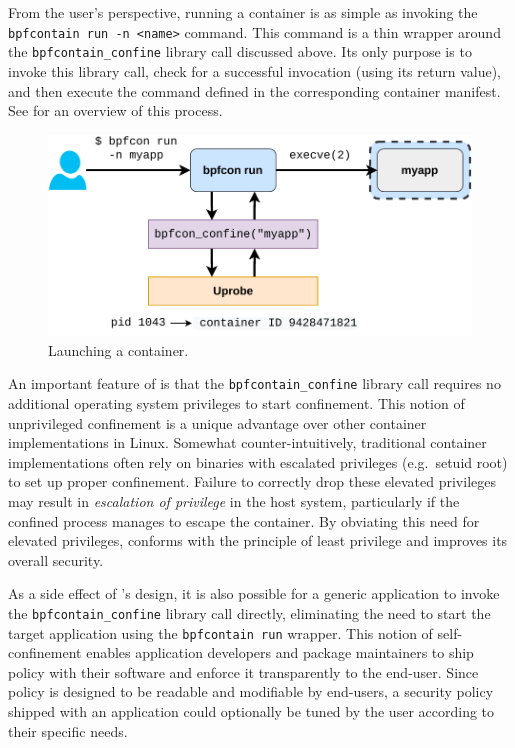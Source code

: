 From the user's perspective, running a \bpfcontain{} container is as simple as invoking the \texttt{bpfcontain run -n <name>} command. This command is a thin wrapper around the \texttt{bpfcontain\_confine} library call discussed above. Its only purpose is to invoke this library call, check for a successful invocation (using its return value), and then execute the command defined in the corresponding container manifest. See  for an overview of this process.

\begin{figure}[htb]
  \centering
  \includegraphics[width=0.6\linewidth]{figs/launch.pdf}
  \caption{Launching a \bpfcontain{} container.}%
  \label{fig:launch}
\end{figure}

An important feature of \bpfcontain{} is that the \lstinline[language=c]|bpfcontain_confine| library call requires no additional operating system privileges to start confinement.  This notion of unprivileged confinement is a unique advantage over other container implementations in Linux.  Somewhat counter-intuitively, traditional container implementations often rely on binaries with escalated privileges (e.g.~setuid root) to set up proper confinement.  Failure to correctly drop these elevated privileges may result in \textit{escalation of privilege} in the host system, particularly if the confined process manages to escape the container.  By obviating this need for elevated privileges, \bpfcontain{} conforms with the principle of least privilege and improves its overall security.

As a side effect of \bpfcontain{}'s design, it is also possible for a generic application to invoke the \lstinline[language=c]|bpfcontain_confine| library call directly, eliminating the need to start the target application using the \texttt{bpfcontain run} wrapper. This notion of self-confinement enables application developers and package maintainers to ship \bpfcontain{} policy with their software and enforce it transparently to the end-user. Since \bpfcontain{} policy is designed to be readable and modifiable by end-users, a security policy shipped with an application could optionally be tuned by the user according to their specific needs.

